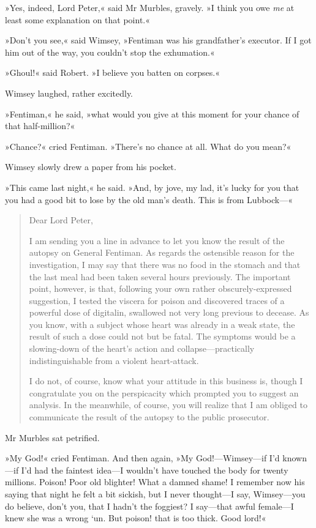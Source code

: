 »Yes, indeed, Lord Peter,« said Mr Murbles, gravely. »I think you owe \textit{me} at least some explanation on that point.«

»Don't you see,« said Wimsey, »Fentiman was his grandfather's executor. If I got him out of the way, you couldn't stop the exhumation.«

»Ghoul!« said Robert. »I believe you batten on corpses.«

Wimsey laughed, rather excitedly.

»Fentiman,« he said, »what would you give at this moment for your chance of that half-million?«

»Chance?« cried Fentiman. »There's no chance at all. What do you mean?«

Wimsey slowly drew a paper from his pocket.

»This came last night,« he said. »And, by jove, my lad, it's lucky for you that you had a good bit to lose by the old man's death. This is from Lubbock—«

\begin{quotation}
\noindent Dear Lord Peter,

\indent I am sending you a line in advance to let you know the result of the autopsy on General Fentiman. As regards the ostensible reason for the investigation, I may say that there was no food in the stomach and that the last meal had been taken several hours previously. The important point, however, is that, following your own rather obscurely-expressed suggestion, I tested the viscera for poison and discovered traces of a powerful dose of digitalin, swallowed not very long previous to decease. As you know, with a subject whose heart was already in a weak state, the result of such a dose could not but be fatal. The symptoms would be a slowing-down of the heart's action and collapse—practically indistinguishable from a violent heart-attack.

I do not, of course, know what your attitude in this business is, though I congratulate you on the perspicacity which prompted you to suggest an analysis. In the meanwhile, of course, you will realize that I am obliged to communicate the result of the autopsy to the public prosecutor.
\end{quotation}

Mr Murbles sat petrified.

»My God!« cried Fentiman. And then again, »My God!—Wimsey—if I'd known—if I'd had the faintest idea—I wouldn't have touched the body for twenty millions. Poison! Poor old blighter! What a damned shame! I remember now his saying that night he felt a bit sickish, but I never thought—I say, Wimsey—you do believe, don't you, that I hadn't the foggiest? I say—that awful female—I knew she was a wrong `un. But poison! that is too thick. Good lord!«

